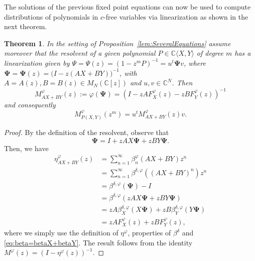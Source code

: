 \documentclass[12pt]{amsart}
\newcommand{\VNEC}{VNEC}
\newcommand{\bPsi}{\boldsymbol{\Psi{}}}
\newtheorem{theorem}{Theorem}[section]
\theoremstyle{definition}
\numberwithin{equation}{section}
\begin{document}
%		
		
		
The solutions of the previous fixed point equations can now be used to
compute  distributions of polynomials in $c$-free variables via linearization
as shown in the next theorem.
\begin{theorem}
  \label{thm:cfreeConvolution}
  In the setting of  Proposition~\ref{lem:SeveralEquations}
  assume moreover that the resolvent of a given polynomial $P \in
  \mathbb{C}\langle X,Y\rangle$ of degree $m$ has a linearization given by
  $\Psi= \Psi(z) = (1-z^mP)^{-1} = u^t\bPsi v$, where $\bPsi=\bPsi(z) = \bigl(I-z(AX+BY)\bigr)^{-1}$, with $A=A(z),B=B(z)\in M_N(\mathbb{C}[z])$ and $u,v\in \mathbb{C}^N$. Then
  \begin{equation*}
    M^\varphi_{AX+BY}(z):=\varphi(\bPsi)
    = (I-zAF^\varphi_X(z)-zBF_Y^\varphi(z))^{-1}
  \end{equation*} and
  consequently
  \[M^{\varphi}_{P(X,Y)}(z^m)=u^t M^\varphi_{AX+BY}(z) v.\]
\end{theorem}

\begin{proof}
  By the definition of the resolvent, observe that
  \begin{equation}
    \label{eq:resolventIdentity}
    \bPsi = I + zAX\bPsi + zBY\bPsi.
  \end{equation}
  Then, we have%
  \begin{align*}
    \eta^\varphi_{AX+BY}(z)
    &=\sum_{n=1}^{\infty}\beta_n^{\varphi}(AX+BY) z^n\\
    &=\sum_{n=1}^{\infty}\beta^{\delta,\varphi}\left((AX+BY)^n\right) z^n\\
    &= \beta^{\delta,\varphi}(\bPsi) - I\\
    &= \beta^{\delta,\varphi}(zAX\bPsi+zBY\bPsi)\\
    &= zA\beta_{X}^{\delta,\varphi}(X\bPsi)+zB\beta_{Y}^{\delta,\varphi}(Y\bPsi)\\
    &= zAF^\varphi_X(z)+zBF^\varphi_Y(z),
  \end{align*}
  where we simply use the definition of $\eta^\varphi$,
  properties of $\beta^\delta$ and
  \eqref{eq:beta=betaX+betaY}.
  The result follows from the identity $M^\varphi(z)=(I-\eta^\varphi(z))^{-1}$.
\end{proof}
		
\end{document}
